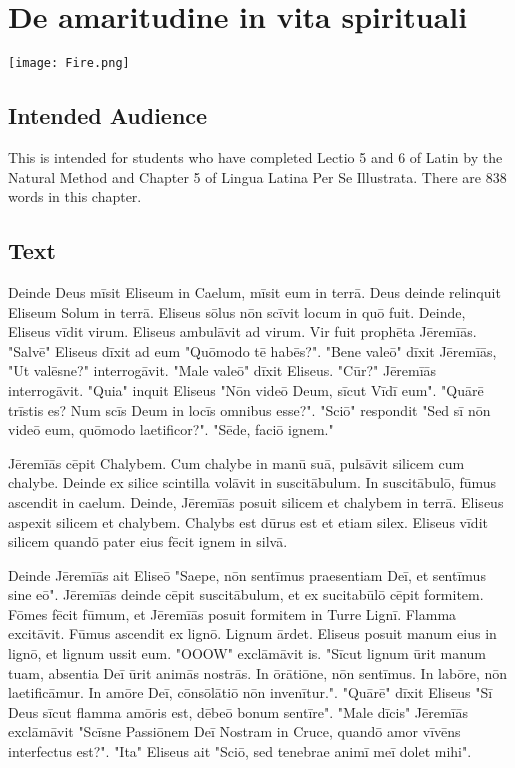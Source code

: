 \chapter{De amaritudine in vita spirituali}
\begin{center}
\texttt{[image: Fire.png]}
\end{center}

\section{Intended Audience}
This is intended for students who have completed Lectio 5 and 6 of Latin by the Natural Method and Chapter 5 of Lingua Latina Per Se Illustrata. There are 838 words in this chapter.

\section{Text}
Deinde Deus mīsit Eliseum in Caelum, mīsit eum in terrā. Deus deinde relinquit Eliseum Solum in terrā. Eliseus sōlus nōn scīvit locum in quō fuit. Deinde, Eliseus vīdit virum. Eliseus ambulāvit ad virum. Vir fuit prophēta Jēremīās. "Salvē" Eliseus dīxit ad eum "Quōmodo tē habēs?". "Bene valeō" dīxit Jēremīās, "Ut valēsne?" interrogāvit. "Male valeō" dīxit Eliseus. "Cūr?" Jēremīās interrogāvit. "Quia" inquit Eliseus "Nōn videō Deum, sīcut Vīdī eum". "Quārē trīstis es? Num scīs Deum in locīs omnibus esse?". "Sciō" respondit "Sed sī nōn videō eum, quōmodo laetificor?". "Sēde, faciō ignem." \par 
Jēremīās cēpit Chalybem. Cum chalybe in manū suā, pulsāvit silicem cum chalybe. Deinde ex silice scintilla volāvit in suscitābulum. In suscitābulō, fūmus ascendit in caelum. Deinde, Jēremīās posuit silicem et chalybem in terrā. Eliseus aspexit silicem et chalybem. Chalybs est dūrus est et etiam silex. Eliseus vīdit silicem quandō pater eius fēcit ignem in silvā. \par
Deinde Jēremīās ait Eliseō "Saepe, nōn sentīmus praesentiam Deī, et sentīmus sine eō". Jēremīās deinde cēpit suscitābulum, et ex sucitabūlō cēpit formitem. Fōmes fēcit fūmum, et Jēremīās posuit formitem in Turre Lignī. Flamma excitāvit. Fūmus ascendit ex lignō. Lignum ārdet. Eliseus posuit manum eius in lignō, et lignum ussit eum. "OOOW" exclāmāvit is. "Sīcut lignum ūrit manum tuam, absentia Deī ūrit animās nostrās. In ōrātiōne, nōn sentīmus. In labōre, nōn laetificāmur. In amōre Deī, cōnsōlātiō nōn invenītur.". "Quārē" dīxit Eliseus "Sī Deus sīcut flamma amōris est, dēbeō bonum sentīre". "Male dīcis" Jēremīās exclāmāvit "Scīsne Passiōnem Deī Nostram in Cruce, quandō amor vīvēns interfectus est?". "Ita" Eliseus ait "Sciō, sed tenebrae animī meī dolet mihi". \par
